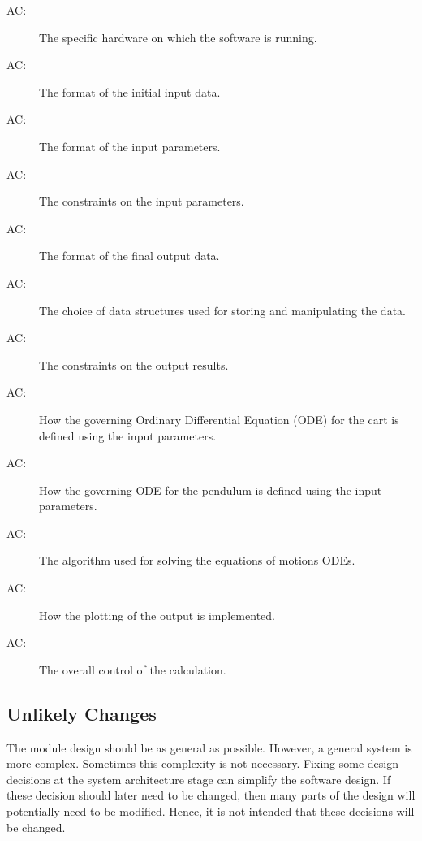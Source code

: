 \documentclass[12pt, titlepage]{article}
\newcounter{acnum}
\newcommand{\actheacnum}{AC\theacnum}
\begin{document}
\begin{description}
\item[ \actheacnum \label{acHardware}:] The specific
  hardware on which the software is running.
\item[ \actheacnum \label{acInput}:] The format of the initial input data.
\item[ \actheacnum \label{acParams}:] The format of the  input parameters.
\item[ \actheacnum \label{acVerify}:] The constraints on
  the input parameters.
\item[ \actheacnum \label{acOutput}:] The format of the  final output data.
\item[ \actheacnum \label{acDS}:] The choice of data structures used for storing and manipulating the data.
\item[ \actheacnum \label{acVerifyOut}:] The constraints on the output results.
\item[ \actheacnum \label{acODEsC}:] How the governing Ordinary Differential Equation (ODE) for the cart is defined using the input parameters.
\item[ \actheacnum \label{acODEsP}:] How the governing ODE for the pendulum is defined using the input parameters.
\item[ \actheacnum \label{acSolver}:] The algorithm used for solving the equations of motions ODEs.
\item[ \actheacnum \label{acPlot}:] How the plotting of the output is implemented.
\item[ \actheacnum \label{acControl}:] The overall control of the calculation.
\end{description}

\subsection{Unlikely Changes} \label{SecUchange}

The module design should be as general as possible. However, a general system is
more complex. Sometimes this complexity is not necessary. Fixing some design
decisions at the system architecture stage can simplify the software design. If
these decision should later need to be changed, then many parts of the design
will potentially need to be modified. Hence, it is not intended that these
decisions will be changed.
\end{document}
